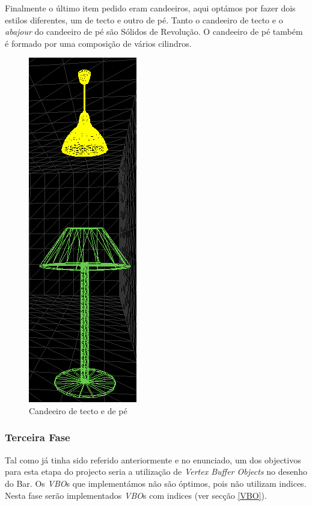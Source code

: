 \documentclass[a5paper,onecolumn, 11pt]{article}
\begin{document}
\begin{description}
Finalmente o último item pedido eram candeeiros, aqui optámos por fazer dois estilos diferentes, um de tecto e outro de pé. Tanto o candeeiro de tecto e o \textit{abajour} do candeeiro de pé são Sólidos de Revolução. O candeeiro de pé também é formado por uma composição de vários cilindros.
\begin{figure}[!htb]
	\centering
	\includegraphics[scale=0.6]{candeeiros.png}
	\caption{Candeeiro de tecto e de pé}
\end{figure}
\end{description}
\clearpage
\subsubsection{Terceira Fase}
Tal como já tinha sido referido anteriormente e no enunciado, um dos objectivos para esta etapa do projecto seria a utilização de \textit{Vertex Buffer Objects} no desenho do Bar. Os \textit{VBO}s que implementámos não são óptimos, pois não utilizam indices. Nesta fase serão implementados \textit{VBO}s com indices (ver secção \ref{VBO}).
\end{document}
